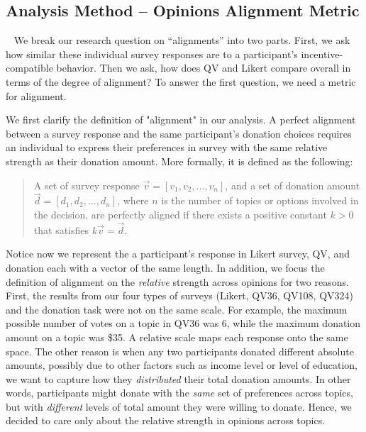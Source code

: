 \subsection{Analysis Method -- Opinions Alignment Metric}~\label{alignment_metric}
We break our research question on ``alignments'' into two parts. First, we ask how similar these individual survey responses are to a participant's incentive-compatible behavior. Then we ask, how does QV and Likert compare overall in terms of the degree of alignment? To answer the first question, we need a metric for alignment.

We first clarify the definition of "alignment" in our analysis. A perfect alignment between a survey response and the same participant's donation choices requires an individual to express their preferences in survey with the same relative strength as their donation amount. More formally, it is defined as the following:

\begin{quote}
    A set of survey response $\vec{v} = [v_1, v_2, ..., v_n]$, and a set of donation amount $\vec{d} = [d_1, d_2, ..., d_n]$, where $n$ is the number of topics or options involved in the decision, are perfectly aligned if there exists a positive constant $k>0$ that satisfies $k\vec{v} = \vec{d}$.
\end{quote}

Notice now we represent the a participant's response in Likert survey, QV, and donation each with a vector of the same length. In addition, we focus the definition of alignment on the \textit{relative} strength across opinions for two reasons. First, the results from our four types of surveys (Likert, QV36, QV108, QV324) 
and the donation task were not on the same scale. 
For example, the maximum possible number of votes on a topic in QV36 was 6, while the maximum donation amount on a topic was \$35. A relative scale maps each response onto the same space. The other reason is when any two participants donated different absolute amounts, possibly due to other factors such as income level or level of education, we want to capture how they \textit{distributed} their total donation amounts. In other words, participants might donate with the \textit{same} set of preferences across topics, but with \textit{different} levels of total amount they were willing to donate. Hence, we decided to care only about 
the relative strength in opinions across topics.

